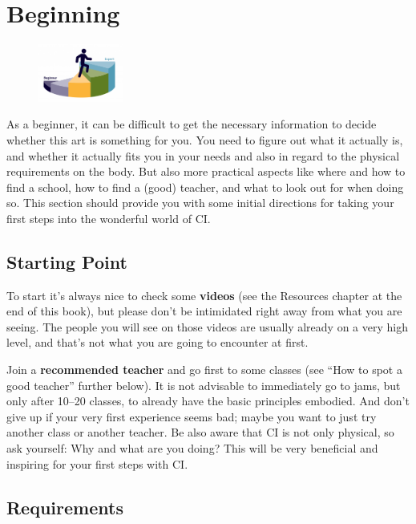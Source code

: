 \chapter{Beginning}\label{ch:beginning}

\begin{figure}
    \centering
    \includegraphics[width=0.25\textwidth]{images/beginning}
\end{figure}

As a beginner, it can be difficult to get the necessary information to decide whether this art is something for you.
You need to figure out what it actually is, and whether it actually fits you in your needs and also in regard to the physical requirements on the body.
But also more practical aspects like where and how to find a school, how to find a (good) teacher, and what to look out for when doing so.
This section should provide you with some initial directions for taking your first steps into the wonderful world of CI\@.

\section{Starting Point}\label{sec:starting-point}

To start it's always nice to check some \textbf{videos} (see the Resources chapter at the end of this book), but please don't be intimidated right away from what you are seeing.
The people you will see on those videos are usually already on a very high level, and that's not what you are going to encounter at first.

Join a \textbf{recommended teacher} and go first to some classes (see ``How to spot a good teacher'' further below).
It is not advisable to immediately go to jams, but only after 10--20 classes, to already have the basic principles embodied.
And don't give up if your very first experience seems bad; maybe you want to just try another class or another teacher.
Be also aware that CI is not only physical, so ask yourself: Why and what are you doing?
This will be very beneficial and inspiring for your first steps with CI\@.

\section{Requirements}\label{sec:requirements}

